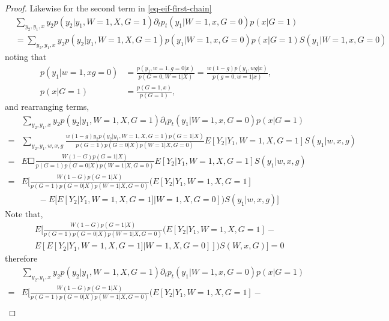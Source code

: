 \documentclass[uplatex,dvipdfmx]{jsarticle}
\begin{document}
\begin{proof}
    Likewise for the second term in \ref{eq-eif-first-chain}
    \begin{align*}
        &\sum_ { y_2 ,y_1,x} y_2  p ( y_2| y_1 , W= 1, X , G= 1)\partial_t p_t ( y_1 | W =1 , x, G= 0 ) p( x | G =1 ) \\
    &=   \sum_ { y_2 ,y_1,x} y_2  p ( y_2| y_1 , W= 1, X , G= 1) p ( y_1 | W =1 , x, G= 0 ) p( x | G =1 ) S( y_1  | W =1, x, G = 0) 
    \end{align*} 
    noting that
    \begin{align*}
    p ( y_1 | w = 1, x g = 0 ) &= \frac{ p ( y _1 , w = 1, g  = 0 |x) } { p ( G =0, W =1 | X) } = \frac{ w ( 1 -g) p( y_1 , w g | x) }{ p  (g =0, w =1 | x) } , \\
    p ( x | G= 1) &= \frac{ p(  G =1, x ) } { p(G =1 ) },
    \end{align*}
    and rearranging terms,
    \begin{align*}
    &\sum_ { y_2 ,y_1,x} y_2  p ( y_2| y_1 , W= 1, X , G= 1)\partial_t p_t ( y_1 | W =1 , x, G= 0 ) p( x | G =1 ) \\ 
    = &\sum_ { y_2 ,y_1,w,x, g} \frac{ w ( 1 -g ) y_2   p ( y_2| y_1 , W= 1, X , G= 1) p(G =1 | X) }{ p(G=1) p ( G= 0 | X)  p ( W = 1 | X ,G =0) } E [ Y_2 |   Y_1 ,W = 1,X, G =1 ]   S( y_1  | w , x, g )  \\
    = &E \Square{   \frac{ W ( 1 -G)   p(G =1 | X) }{ p(G=1) p ( G= 0 | X)  p ( W = 1 | X ,G =0) } E [ Y_2 |   Y_1 ,W = 1, X, G =1 ]   S( y_1  | w , x, g )}\\
    = &E \biggl[  \frac{  W ( 1 -G)   p(G =1 | X) }{ p(G=1) p ( G= 0 | X)  p ( W = 1 | X ,G =0) } (E [ Y_2 |   Y_1 ,W = 1, X, G =1] \\
    &\qquad -E [ E[ Y_2 | Y_1 , W =1 , X, G =1 ] | W=1, X, G= 0 ] )  S( y_1  | w , x, g ) \biggr]
    \end{align*}
    Note that,
    \begin{align*}
    &E \biggl[  \frac{  W ( 1 -G)   p(G =1 | X) }{ p(G=1) p ( G= 0 | X)  p ( W = 1 | X ,G =0) } (E [ Y_2 |   Y_1 ,W = 1, X, G =1 ] - \\
    &E [ E[ Y_2 | Y_1 , W =1 , X, G =1 ] | W=1, X, G= 0 ]] )  S(  W , x, G ) \biggr] = 0
    \end{align*}
    therefore
    \begin{align*}
    &\sum_ { y_2 ,y_1,x} y_2  p ( y_2| y_1 , W= 1, X , G= 1)\partial_t p_t ( y_1 | W =1 , x, G= 0 ) p( x | G =1 ) \\ 
    = &E \biggl[  \frac{  W ( 1 -G)   p(G =1 | X) }{ p(G=1) p ( G= 0 | X)  p ( W = 1 | X ,G =0) } (E [ Y_2 |   Y_1 ,W = 1, X, G =1 ] -\\

\end{align*}
\end{proof}
\end{document}
